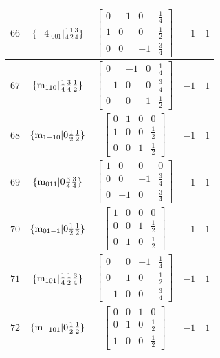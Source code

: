 \documentclass[fleqn,8pt]{jsarticle}
\begin{document}
\begin{longtable}{ccccc}
$ 66 $ & $ \{-4^{-}_{\,\,001}|\frac{1}{4} \frac{1}{2} \frac{3}{4}\} $ & $ \begin{bmatrix} 0 & -1 & 0 & \frac{1}{4} \\ 1 & 0 & 0 & \frac{1}{2} \\ 0 & 0 & -1 & \frac{3}{4} \end{bmatrix} $ & $ -1 $ & $ 1 $ \\ \hline
$ 67 $ & $ \{{\rm m}_{110}|\frac{1}{4} \frac{3}{4} \frac{1}{2}\} $ & $ \begin{bmatrix} 0 & -1 & 0 & \frac{1}{4} \\ -1 & 0 & 0 & \frac{3}{4} \\ 0 & 0 & 1 & \frac{1}{2} \end{bmatrix} $ & $ -1 $ & $ 1 $ \\ \hline
$ 68 $ & $ \{{\rm m}_{1-10}|0 \frac{1}{2} \frac{1}{2}\} $ & $ \begin{bmatrix} 0 & 1 & 0 & 0 \\ 1 & 0 & 0 & \frac{1}{2} \\ 0 & 0 & 1 & \frac{1}{2} \end{bmatrix} $ & $ -1 $ & $ 1 $ \\ \hline
$ 69 $ & $ \{{\rm m}_{011}|0 \frac{3}{4} \frac{3}{4}\} $ & $ \begin{bmatrix} 1 & 0 & 0 & 0 \\ 0 & 0 & -1 & \frac{3}{4} \\ 0 & -1 & 0 & \frac{3}{4} \end{bmatrix} $ & $ -1 $ & $ 1 $ \\ \hline
$ 70 $ & $ \{{\rm m}_{01-1}|0 \frac{1}{2} \frac{1}{2}\} $ & $ \begin{bmatrix} 1 & 0 & 0 & 0 \\ 0 & 0 & 1 & \frac{1}{2} \\ 0 & 1 & 0 & \frac{1}{2} \end{bmatrix} $ & $ -1 $ & $ 1 $ \\ \hline
$ 71 $ & $ \{{\rm m}_{101}|\frac{1}{4} \frac{1}{2} \frac{3}{4}\} $ & $ \begin{bmatrix} 0 & 0 & -1 & \frac{1}{4} \\ 0 & 1 & 0 & \frac{1}{2} \\ -1 & 0 & 0 & \frac{3}{4} \end{bmatrix} $ & $ -1 $ & $ 1 $ \\ \hline
$ 72 $ & $ \{{\rm m}_{-101}|0 \frac{1}{2} \frac{1}{2}\} $ & $ \begin{bmatrix} 0 & 0 & 1 & 0 \\ 0 & 1 & 0 & \frac{1}{2} \\ 1 & 0 & 0 & \frac{1}{2} \end{bmatrix} $ & $ -1 $ & $ 1 $ \\ \hline

\end{longtable}
\end{document}
